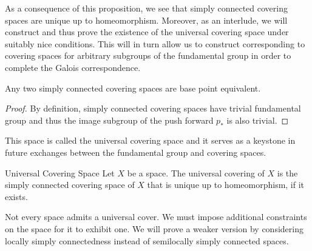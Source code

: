 \documentclass[a4paper]{article}
\begin{document}
As a consequence of this proposition, we see that simply connected covering spaces are unique up to homeomorphism. Moreover, as an interlude, we will construct and thus prove the existence of the universal covering space under suitably nice conditions. This will in turn allow us to construct corresponding to covering spaces for arbitrary subgroups of the fundamental group in order to complete the Galois correspondence. 

\begin{crl}{}{} Any two simply connected covering spaces are base point equivalent. 
\begin{proof}
By definition, simply connected covering spaces have trivial fundamental group and thus the image subgroup of the push forward $p_\ast$ is also trivial. 
\end{proof}
\end{crl}

This space is called the universal covering space and it serves as a keystone in future exchanges between the fundamental group and covering spaces. 

\begin{defn}{Universal Covering Space}{} Let $X$ be a space. The universal covering of $X$ is the simply connected covering space of $X$ that is unique up to homeomorphism, if it exists. 
\end{defn}

Not every space admits a universal cover. We must impose additional constraints on the space for it to exhibit one. We will prove a weaker version by considering locally simply connectedness instead of semilocally simply connected spaces. 
\end{document}
